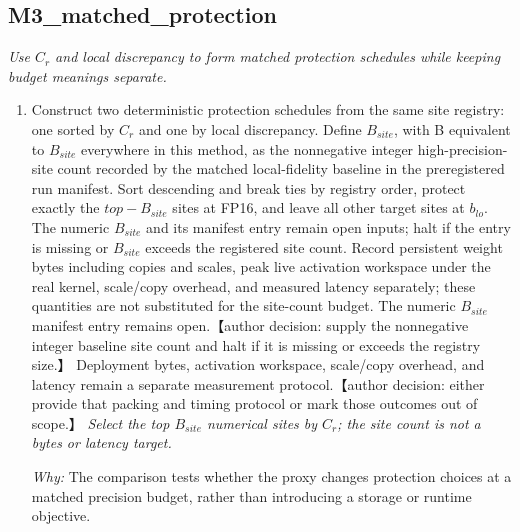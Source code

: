 \documentclass[10pt,a4paper]{article}
\begin{document}
\subsection*{M3\_matched\_protection}
\emph{Use \(C_{r}\) and local discrepancy to form matched protection schedules while keeping budget meanings separate.}
\begin{enumerate}[leftmargin=*,start=4]
  \item Construct two deterministic protection schedules from the same site registry: one sorted by \(C_{r}\) and one by local discrepancy. Define \(B_{site}\), with B equivalent to \(B_{site}\) everywhere in this method, as the nonnegative integer high-precision-site count recorded by the matched local-fidelity baseline in the preregistered run manifest. Sort descending and break ties by registry order, protect exactly the \(top-B_{site}\) sites at FP16, and leave all other target sites at \(b_{lo}\). The numeric \(B_{site}\) and its manifest entry remain open inputs;\allowbreak{} halt if the entry is missing or \(B_{site}\) exceeds the registered site count. Record persistent weight bytes including copies and scales, peak live activation workspace under the real kernel, scale/copy overhead, and measured latency separately;\allowbreak{} these quantities are not substituted for the site-count budget. The numeric \(B_{site}\) manifest entry remains open.【author decision: supply the nonnegative integer baseline site count and halt if it is missing or exceeds the registry size.】 Deployment bytes, activation workspace, scale/copy overhead, and latency remain a separate measurement protocol.【author decision: either provide that packing and timing protocol or mark those outcomes out of scope.】
\noindent\emph{Select the top \(B_{site}\) numerical sites by \(C_{r}\);\allowbreak{} the site count is not a bytes or latency target.}
\par{}
\par\emph{Why:} The comparison tests whether the proxy changes protection choices at a matched precision budget, rather than introducing a storage or runtime objective.
\end{enumerate}
\end{document}
